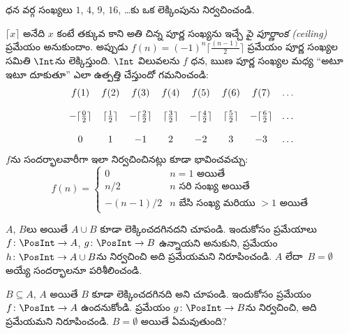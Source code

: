 \documentclass[../../../include/open-logic-section]{subfiles}
\begin{document}
\begin{prob}
ధన వర్గ సంఖ్యలు $1$, $4$, $9$, $16$, \dots కు ఒక లెక్కింపును
నిర్వచించండి.
\end{prob}

\begin{ex}
$\lceil x \rceil$ అనేది $x$ కంటే తక్కువ కాని అతి చిన్న పూర్ణ సంఖ్యను
ఇచ్చే \emph{పై పూర్ణాంక (ceiling)} ప్రమేయం అనుకుందాం. అప్పుడు
$f(n) = (-1)^{n} \lceil \frac{(n-1)}{2}\rceil$ ప్రమేయం పూర్ణ సంఖ్యల
సమితి $\Int$ను లెక్కిస్తుంది. $\Int$ విలువలను $f$ ధన, ఋణ పూర్ణ
సంఖ్యల మధ్య ``అటూ ఇటూ దూకుతూ'' ఎలా ఉత్పత్తి చేస్తుందో గమనించండి:
\[
\begin{array}{c c c c c c c c}
f(1) & f(2) & f(3) & f(4) & f(5) & f(6) & f(7) & \dots \\ \\
- \lceil \tfrac{0}{2} \rceil & \lceil \tfrac{1}{2}\rceil & - \lceil \tfrac{2}{2} \rceil & \lceil \tfrac{3}{2} \rceil & - \lceil \tfrac{4}{2} \rceil  & \lceil \tfrac{5}{2}
\rceil & - \lceil \tfrac{6}{2} \rceil & \dots \\ \\
0 & 1 & -1 & 2 & -2 & 3 & -3 & \dots
\end{array}
\]
$f$ను సందర్భాలవారీగా ఇలా నిర్వచించినట్లు కూడా భావించవచ్చు:
\[
f(n) = \begin{cases}
  0 & \text{$n = 1$ అయితే}\\
  n/2 & \text{$n$ సరి సంఖ్య అయితే}\\
  -(n-1)/2 & \text{$n$ బేసి సంఖ్య మరియు $>1$ అయితే}
  \end{cases}
\]
\end{ex}

\begin{prob}
  $A$, $B$లు  అయితే $A \cup B$ కూడా లెక్కించదగినదని
  చూపండి. ఇందుకోసం  ప్రమేయాలు $f\colon \PosInt \to A$,
  $g\colon \PosInt \to B$ ఉన్నాయని అనుకుని,  ప్రమేయం
  $h\colon \PosInt \to A \cup B$ను నిర్వచించి అది  ప్రమేయమని
  నిరూపించండి. $A$ లేదా~$B = \emptyset$ అయ్యే సందర్భాలనూ పరిశీలించండి.
\end{prob}

\begin{prob}
  $B \subseteq A$, $A$  అయితే $B$ కూడా లెక్కించదగినది
  అని చూపండి. ఇందుకోసం  ప్రమేయం $f\colon \PosInt \to
  A$ ఉందనుకోండి.  ప్రమేయం $g\colon \PosInt \to B$ను
  నిర్వచించి, అది  ప్రమేయమని నిరూపించండి. $B = \emptyset$
  అయితే ఏమవుతుంది?
\end{prob}
\end{document}
